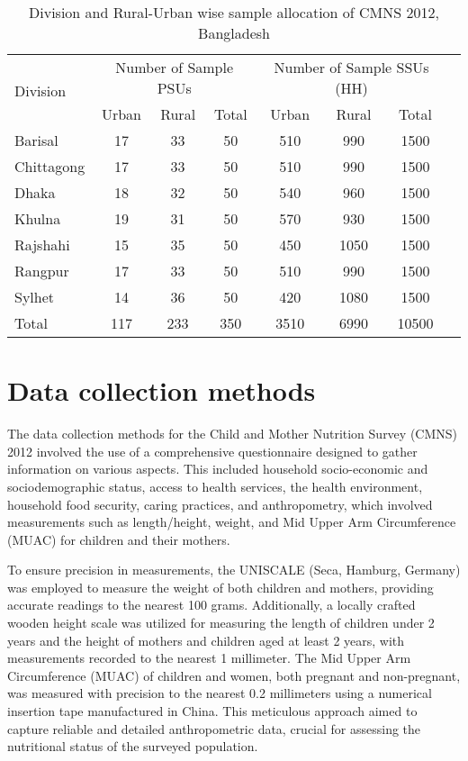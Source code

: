 \documentclass{report}
\begin{document}
\pagebreak
\begin{table}[ht]
\centering
\caption{Division and Rural-Urban wise sample allocation of CMNS 2012, Bangladesh}
\label{tab:sample_allocation}
\begin{tabular}{lccccccc}
\toprule
\multirow{2}{*}{Division} & \multicolumn{3}{c}{Number of Sample PSUs} & \multicolumn{3}{c}{Number of Sample SSUs (HH)}  \\
\cmidrule(lr){2-4} \cmidrule(lr){5-7}
& Urban & Rural & Total & Urban & Rural & Total & \\
\midrule
Barisal & 17 & 33 & 50 & 510 & 990 & 1500 \\
Chittagong & 17 & 33 & 50 & 510 & 990 & 1500 \\
Dhaka & 18 & 32 & 50 & 540 & 960 & 1500 \\
Khulna & 19 & 31 & 50 & 570 & 930 & 1500 \\
Rajshahi & 15 & 35 & 50 & 450 & 1050 & 1500 \\
Rangpur & 17 & 33 & 50 & 510 & 990 & 1500 \\
Sylhet & 14 & 36 & 50 & 420 & 1080 & 1500 \\
\midrule
Total & 117 & 233 & 350 & 3510 & 6990 & 10500 \\
\bottomrule
\end{tabular}
\end{table}


\section{Data collection methods}
The data collection methods for the Child and Mother Nutrition Survey (CMNS) 2012 involved the use of a comprehensive questionnaire designed to gather information on various aspects. This included household socio-economic and sociodemographic status, access to health services, the health environment, household food security, caring practices, and anthropometry, which involved measurements such as length/height, weight, and Mid Upper Arm Circumference (MUAC) for children and their mothers.


To ensure precision in measurements, the UNISCALE (Seca, Hamburg, Germany) was employed to measure the weight of both children and mothers, providing accurate readings to the nearest 100 grams. Additionally, a locally crafted wooden height scale was utilized for measuring the length of children under 2 years and the height of mothers and children aged at least 2 years, with measurements recorded to the nearest 1 millimeter. The Mid Upper Arm Circumference (MUAC) of children and women, both pregnant and non-pregnant, was measured with precision to the nearest 0.2 millimeters using a numerical insertion tape manufactured in China. This meticulous approach aimed to capture reliable and detailed anthropometric data, crucial for assessing the nutritional status of the surveyed population.
\end{document}
